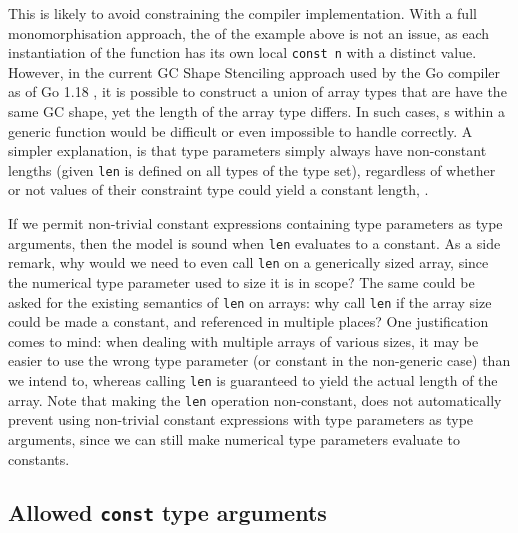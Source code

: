 
This is likely to avoid constraining the compiler implementation. With a full
monomorphisation approach, the  of the example above is not an issue,
as each instantiation of the function has its own local \texttt{const n} with a
distinct value. However, in the current GC Shape Stenciling approach used by the
Go compiler as of Go 1.18 \autocite{generics1.18}, it is possible to construct a
union of array types that are have the same GC shape, yet the length of the
array type differs. In such cases, s within a generic function would
be difficult or even impossible to handle correctly. A simpler explanation, is
that type parameters simply always have non-constant lengths (given \texttt{len}
is defined on all types of the type set), regardless of whether or not values
of their constraint type could yield a constant length, \autocite{spec}.

If we permit non-trivial constant expressions containing type parameters as type
arguments, then the model is sound when \texttt{len} evaluates to a constant. As
a side remark, why would we need to even call \texttt{len} on a generically
sized array, since the numerical type parameter used to size it is in scope? The
same could be asked for the existing semantics of \texttt{len} on arrays: why
call \texttt{len} if the array size could be made a constant, and referenced in
multiple places? One justification comes to mind: when dealing with multiple
arrays of various sizes, it may be easier to use the wrong type parameter (or
constant in the non-generic case) than we intend to, whereas calling
\texttt{len} is guaranteed to yield the actual length of the array. Note that
making the \texttt{len} operation non-constant, does not automatically prevent
using non-trivial constant expressions with type parameters as type arguments,
since we can still make numerical type parameters evaluate to constants.



\subsection{Allowed \texttt{const} type arguments}


